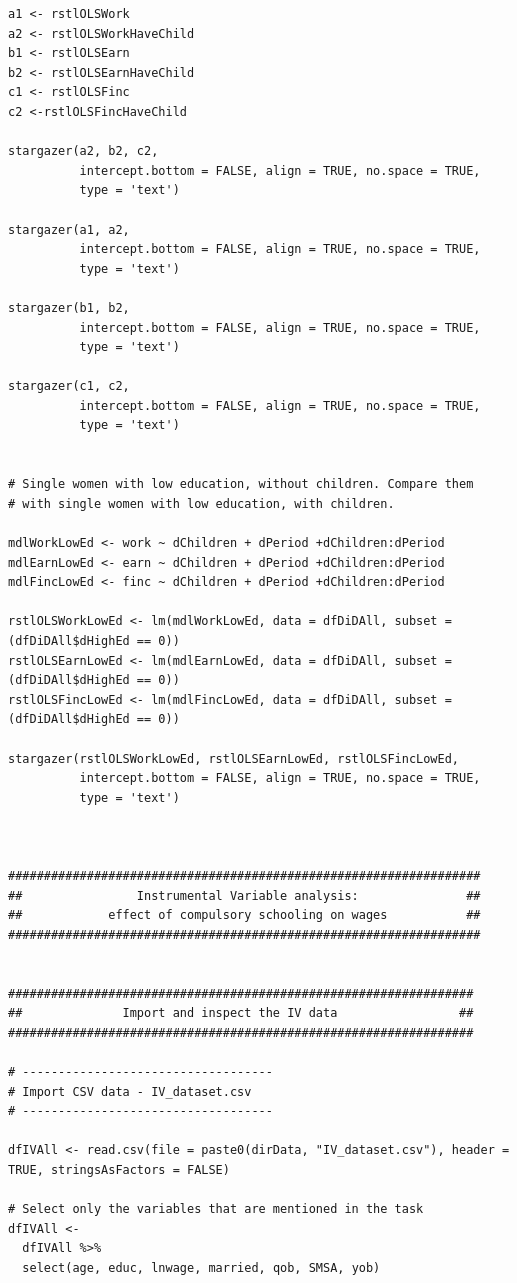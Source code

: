 \documentclass{article}
\begin{document}
\begin{tiny}
\begin{verbatim}
a1 <- rstlOLSWork
a2 <- rstlOLSWorkHaveChild
b1 <- rstlOLSEarn
b2 <- rstlOLSEarnHaveChild
c1 <- rstlOLSFinc
c2 <-rstlOLSFincHaveChild

stargazer(a2, b2, c2,
          intercept.bottom = FALSE, align = TRUE, no.space = TRUE,
          type = 'text')

stargazer(a1, a2,
          intercept.bottom = FALSE, align = TRUE, no.space = TRUE,
          type = 'text')

stargazer(b1, b2,
          intercept.bottom = FALSE, align = TRUE, no.space = TRUE,
          type = 'text')

stargazer(c1, c2,
          intercept.bottom = FALSE, align = TRUE, no.space = TRUE,
          type = 'text')


# Single women with low education, without children. Compare them
# with single women with low education, with children.

mdlWorkLowEd <- work ~ dChildren + dPeriod +dChildren:dPeriod
mdlEarnLowEd <- earn ~ dChildren + dPeriod +dChildren:dPeriod
mdlFincLowEd <- finc ~ dChildren + dPeriod +dChildren:dPeriod

rstlOLSWorkLowEd <- lm(mdlWorkLowEd, data = dfDiDAll, subset = (dfDiDAll$dHighEd == 0))
rstlOLSEarnLowEd <- lm(mdlEarnLowEd, data = dfDiDAll, subset = (dfDiDAll$dHighEd == 0))
rstlOLSFincLowEd <- lm(mdlFincLowEd, data = dfDiDAll, subset = (dfDiDAll$dHighEd == 0))

stargazer(rstlOLSWorkLowEd, rstlOLSEarnLowEd, rstlOLSFincLowEd,
          intercept.bottom = FALSE, align = TRUE, no.space = TRUE,
          type = 'text')



##################################################################
##                Instrumental Variable analysis:               ##
##            effect of compulsory schooling on wages           ##
##################################################################


#################################################################
##              Import and inspect the IV data                 ##
#################################################################

# -----------------------------------
# Import CSV data - IV_dataset.csv
# -----------------------------------

dfIVAll <- read.csv(file = paste0(dirData, "IV_dataset.csv"), header = TRUE, stringsAsFactors = FALSE)

# Select only the variables that are mentioned in the task
dfIVAll <- 
  dfIVAll %>%
  select(age, educ, lnwage, married, qob, SMSA, yob)


\end{verbatim}
\end{tiny}
\end{document}

